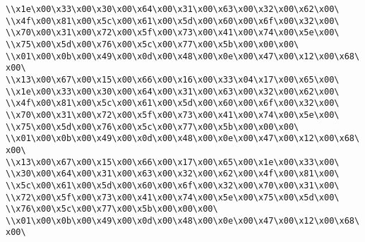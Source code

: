 \verb|\\x1e\x00\x33\x00\x30\x00\x64\x00\x31\x00\x63\x00\x32\x00\x62\x00\|\newline
\verb|\\x4f\x00\x81\x00\x5c\x00\x61\x00\x5d\x00\x60\x00\x6f\x00\x32\x00\|\newline
\verb|\\x70\x00\x31\x00\x72\x00\x5f\x00\x73\x00\x41\x00\x74\x00\x5e\x00\|\newline
\verb|\\x75\x00\x5d\x00\x76\x00\x5c\x00\x77\x00\x5b\x00\x00\x00\|\newline
\verb|\\x01\x00\x0b\x00\x49\x00\x0d\x00\x48\x00\x0e\x00\x47\x00\x12\x00\x68\x00\|\newline
\verb|\\x13\x00\x67\x00\x15\x00\x66\x00\x16\x00\x33\x04\x17\x00\x65\x00\|\newline
\verb|\\x1e\x00\x33\x00\x30\x00\x64\x00\x31\x00\x63\x00\x32\x00\x62\x00\|\newline
\verb|\\x4f\x00\x81\x00\x5c\x00\x61\x00\x5d\x00\x60\x00\x6f\x00\x32\x00\|\newline
\verb|\\x70\x00\x31\x00\x72\x00\x5f\x00\x73\x00\x41\x00\x74\x00\x5e\x00\|\newline
\verb|\\x75\x00\x5d\x00\x76\x00\x5c\x00\x77\x00\x5b\x00\x00\x00\|\newline
\verb|\\x01\x00\x0b\x00\x49\x00\x0d\x00\x48\x00\x0e\x00\x47\x00\x12\x00\x68\x00\|\newline
\verb|\\x13\x00\x67\x00\x15\x00\x66\x00\x17\x00\x65\x00\x1e\x00\x33\x00\|\newline
\verb|\\x30\x00\x64\x00\x31\x00\x63\x00\x32\x00\x62\x00\x4f\x00\x81\x00\|\newline
\verb|\\x5c\x00\x61\x00\x5d\x00\x60\x00\x6f\x00\x32\x00\x70\x00\x31\x00\|\newline
\verb|\\x72\x00\x5f\x00\x73\x00\x41\x00\x74\x00\x5e\x00\x75\x00\x5d\x00\|\newline
\verb|\\x76\x00\x5c\x00\x77\x00\x5b\x00\x00\x00\|\newline
\verb|\\x01\x00\x0b\x00\x49\x00\x0d\x00\x48\x00\x0e\x00\x47\x00\x12\x00\x68\x00\|\newline
